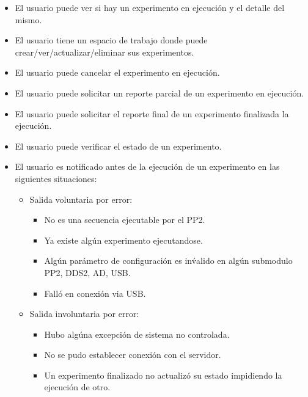 \begin{itemize}
\item El usuario puede ver si hay un experimento en ejecuci\'on y el detalle del mismo.
\item El usuario tiene un espacio de trabajo donde puede crear/ver/actualizar/eliminar sus experimentos.
\item El usuario puede cancelar el experimento en ejecuci\'on.
\item El usuario puede solicitar un reporte parcial de un experimento en ejecuci\'on.
\item El usuario puede solicitar el reporte final de un experimento finalizada la ejecuci\'on.
\item El usuario puede verificar el estado de un experimento.
\item El usuario es notificado antes de la ejecuci\'on de un experimento en las siguientes situaciones:
    \begin{itemize}
    \item Salida voluntaria por error:
        \begin{itemize}
        \item No es una secuencia ejecutable por el PP2.
        \item Ya existe alg\'un experimento ejecutandose.
        \item Alg\'un par\'ametro de configuraci\'on es in\'valido en alg\'un submodulo PP2, DDS2, AD, USB.
        \item Fall\'o en conexi\'on via USB.
        \end{itemize}
    \end{itemize}    
    \begin{itemize}    
    \item Salida involuntaria por error:
        \begin{itemize}
        \item Hubo alg\'una excepci\'on de sistema no controlada.
        \item No se pudo establecer conexi\'on con el servidor.
        \item Un experimento finalizado no actualiz\'o su estado impidiendo la ejecuci\'on de otro.
        \end{itemize}
    \end{itemize}
\end{itemize}

